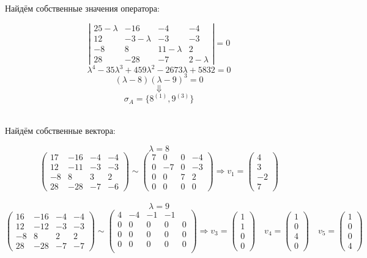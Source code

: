 \documentclass{article}
\begin{document}
\begin{center}
Найдём собственные значения оператора:
\end{center}
$$\left|\begin{matrix}
25-\lambda & -16 & -4 & -4 \\
12 & -3-\lambda & -3 & -3 \\
-8 & 8 & 11-\lambda & 2 \\
28 & -28 & -7 & 2-\lambda
\end{matrix}\right| = 0$$
$$\lambda^4-35\lambda^3+459\lambda^2-2673\lambda+5832 = 0$$
$$(\lambda-8)(\lambda-9)^3=0$$
$$\Downarrow$$
$$\sigma_A = \{8^{(1)},9^{(3)}\}$$ \\
\begin{center}
Найдём собственные вектора:
\end{center}
$$\lambda = 8$$
$$\begin{pmatrix}
17 & -16 & -4 & -4 \\
12 & -11 & -3 & -3 \\
-8 & 8 & 3 & 2 \\
28 & -28 & -7 & -6
\end{pmatrix} \sim \begin{pmatrix}
7 & 0 & 0 & -4 \\
0 & -7 & 0 & -3 \\
0 & 0 & 7 & 2 \\
0 & 0 & 0 & 0
\end{pmatrix} \Rightarrow v_1 = \begin{pmatrix}
4 \\ 3 \\ -2 \\ 7
\end{pmatrix}$$\\
$$\lambda = 9$$
$$\begin{pmatrix}
16 & -16 & -4 & -4 \\
12 & -12 & -3 & -3 \\
-8 & 8 & 2 & 2 \\
28 & -28 & -7 & -7
\end{pmatrix} \sim \begin{pmatrix}
4 & -4 & -1 & -1\\
0 & 0 & 0 & 0 & 0 \\
0 & 0 & 0 & 0 & 0 \\
0 & 0 & 0 & 0 & 0 \\
\end{pmatrix} \Rightarrow  v_3 = \begin{pmatrix}
1 \\ 1 \\ 0 \\ 0
\end{pmatrix} \quad v_4 = \begin{pmatrix}
1 \\ 0 \\ 4 \\ 0
\end{pmatrix} \quad v_5 = \begin{pmatrix}
1 \\ 0 \\ 0 \\ 4
\end{pmatrix}$$
\end{document}
